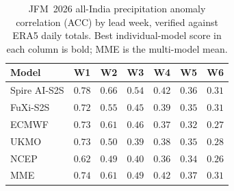 \begin{table}[t]
  \centering
  \caption{JFM~2026 all-India precipitation anomaly correlation (ACC) by lead week, verified against ERA5 daily totals. Best individual-model score in each column is bold; MME is the multi-model mean.}
  \label{tab:jfm_acc_tp}
  \small
  \begin{tabular}{lcccccc}
    \toprule
    Model & W1 & W2 & W3 & W4 & W5 & W6 \\
    \midrule
    Spire AI-S2S   & $\mathbf{0.78}$ & $\mathbf{0.66}$ & $\mathbf{0.54}$ & $\mathbf{0.42}$ & $\mathbf{0.36}$ & $\mathbf{0.31}$ \\
FuXi-S2S       & $0.72$ & $0.55$ & $0.45$ & $0.39$ & $0.35$ & $0.31$ \\
ECMWF          & $0.73$ & $0.61$ & $0.46$ & $0.37$ & $0.32$ & $0.27$ \\
UKMO           & $0.73$ & $0.50$ & $0.39$ & $0.38$ & $0.35$ & $0.28$ \\
NCEP           & $0.62$ & $0.49$ & $0.40$ & $0.36$ & $0.34$ & $0.26$ \\
MME            & $0.74$ & $0.61$ & $0.49$ & $0.42$ & $0.37$ & $0.31$ \\
    \bottomrule
  \end{tabular}
\end{table}
